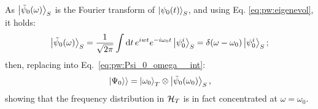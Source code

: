 As $\ket{\tilde{\psi}_{0}(\omega)}_{S}$ is the Fourier transform of $\ket{\psi_0(t)}_S$, and using Eq. \eqref{eq:pw:eigenevol}, it holds:
\[
  \ket{\tilde{\psi}_0(\omega)}_S = \frac{1}{\sqrt{2\pi}} \int \dd{t} e^{iwt} e^{-i\omega_{0}t} \ket{\psi_0^i}_S
  = \delta(\omega-\omega_0)\ket{\psi_0^i}_S \text{;}
\]
then, replacing into Eq.~\eqref{eq:pw:Psi_0_omega__int}:
\begin{equation}\label{eq:pw:Psi_0_omega}
  \left.\left| \Psi_0 \right\rangle\right\rangle = \ket{\omega_0}_{T}\otimes\ket{\tilde{\psi}_{0}(\omega_0)}_{S} \text{,}
\end{equation}
%
showing that the frequency distribution in $\mathcal{H}_T$ is in fact concentrated at $\omega = \omega_0$. 







